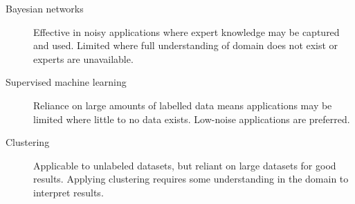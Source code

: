 \documentclass[12pt,notitlepage]{article}
\begin{document}
\begin{description}

    \item[Bayesian networks] Effective in noisy applications where expert
        knowledge may be captured and used. Limited where full understanding of
        domain does not exist or experts are unavailable.

    \item[Supervised machine learning] Reliance on large amounts of labelled data means
        applications may be limited where little to no data exists. Low-noise
        applications are preferred.

    \item[Clustering] Applicable to unlabeled datasets, but reliant on large
        datasets for good results. Applying clustering requires some
        understanding in the domain to interpret results. 

\end{description}


%
%
\end{document}
